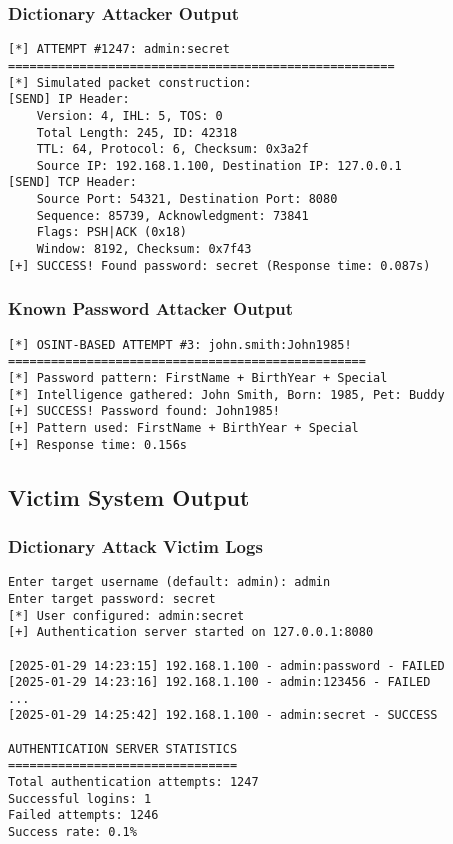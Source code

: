 \documentclass[12pt,a4paper]{article}
\begin{document}
\subsubsection{Dictionary Attacker Output}
\begin{lstlisting}[caption=Dictionary Attack Log Sample]
[*] ATTEMPT #1247: admin:secret
======================================================
[*] Simulated packet construction:
[SEND] IP Header:
    Version: 4, IHL: 5, TOS: 0
    Total Length: 245, ID: 42318
    TTL: 64, Protocol: 6, Checksum: 0x3a2f
    Source IP: 192.168.1.100, Destination IP: 127.0.0.1
[SEND] TCP Header:
    Source Port: 54321, Destination Port: 8080
    Sequence: 85739, Acknowledgment: 73841
    Flags: PSH|ACK (0x18)
    Window: 8192, Checksum: 0x7f43
[+] SUCCESS! Found password: secret (Response time: 0.087s)
\end{lstlisting}

\subsubsection{Known Password Attacker Output}
\begin{lstlisting}[caption=OSINT Attack Log Sample]
[*] OSINT-BASED ATTEMPT #3: john.smith:John1985!
==================================================
[*] Password pattern: FirstName + BirthYear + Special
[*] Intelligence gathered: John Smith, Born: 1985, Pet: Buddy
[+] SUCCESS! Password found: John1985!
[+] Pattern used: FirstName + BirthYear + Special  
[+] Response time: 0.156s
\end{lstlisting}

\subsection{Victim System Output}

\subsubsection{Dictionary Attack Victim Logs}
\begin{lstlisting}[caption=Dictionary Victim Server Logs]
Enter target username (default: admin): admin
Enter target password: secret
[*] User configured: admin:secret
[+] Authentication server started on 127.0.0.1:8080

[2025-01-29 14:23:15] 192.168.1.100 - admin:password - FAILED
[2025-01-29 14:23:16] 192.168.1.100 - admin:123456 - FAILED
...
[2025-01-29 14:25:42] 192.168.1.100 - admin:secret - SUCCESS

AUTHENTICATION SERVER STATISTICS
================================
Total authentication attempts: 1247
Successful logins: 1
Failed attempts: 1246
Success rate: 0.1%
\end{lstlisting}
\end{document}
